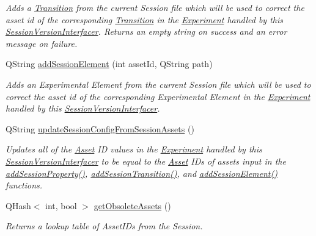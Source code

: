 \begin{DoxyCompactItemize}
\begin{DoxyCompactList}\small\item\em Adds a \hyperlink{class_picto_1_1_transition}{Transition} from the current Session file which will be used to correct the asset id of the corresponding \hyperlink{class_picto_1_1_transition}{Transition} in the \hyperlink{class_picto_1_1_experiment}{Experiment} handled by this \hyperlink{class_picto_1_1_session_version_interfacer}{Session\-Version\-Interfacer}. Returns an empty string on success and an error message on failure. \end{DoxyCompactList}\item 
Q\-String \hyperlink{class_picto_1_1_session_version_interfacer_a159bb9cf03088be02f43d30022914ee4}{add\-Session\-Element} (int asset\-Id, Q\-String path)
\begin{DoxyCompactList}\small\item\em Adds an Experimental Element from the current Session file which will be used to correct the asset id of the corresponding Experimental Element in the \hyperlink{class_picto_1_1_experiment}{Experiment} handled by this \hyperlink{class_picto_1_1_session_version_interfacer}{Session\-Version\-Interfacer}. \end{DoxyCompactList}\item 
Q\-String \hyperlink{class_picto_1_1_session_version_interfacer_ab41b3eb8c80b1760f03b7871deea95e7}{update\-Session\-Config\-From\-Session\-Assets} ()
\begin{DoxyCompactList}\small\item\em Updates all of the \hyperlink{class_picto_1_1_asset}{Asset} I\-D values in the \hyperlink{class_picto_1_1_experiment}{Experiment} handled by this \hyperlink{class_picto_1_1_session_version_interfacer}{Session\-Version\-Interfacer} to be equal to the \hyperlink{class_picto_1_1_asset}{Asset} I\-Ds of assets input in the \hyperlink{class_picto_1_1_session_version_interfacer_a85fa3836fd8d081936dfecd74424e220}{add\-Session\-Property()}, \hyperlink{class_picto_1_1_session_version_interfacer_a65d97b008ff49d9b9451687d8cc178ec}{add\-Session\-Transition()}, and \hyperlink{class_picto_1_1_session_version_interfacer_a159bb9cf03088be02f43d30022914ee4}{add\-Session\-Element()} functions. \end{DoxyCompactList}\item 
Q\-Hash$<$ int, bool $>$ \hyperlink{class_picto_1_1_session_version_interfacer_a226ca2af73c8ebbd2c475a38b791b50a}{get\-Obsolete\-Assets} ()
\begin{DoxyCompactList}\small\item\em Returns a lookup table of Asset\-I\-Ds from the Session. \end{DoxyCompactList}\end{DoxyCompactItemize}



